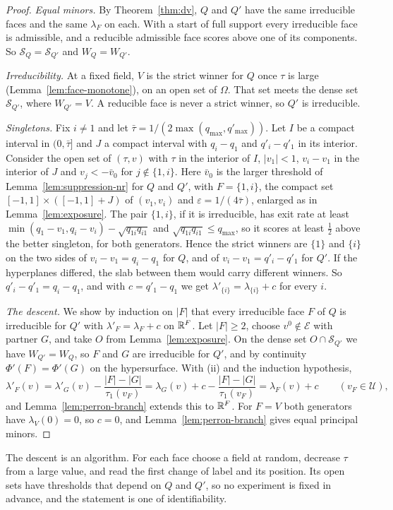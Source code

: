 \begin{proof}
\emph{Equal minors.} By Theorem~\ref{thm:dv}, $Q$ and $Q'$ have the same irreducible faces and
the same $\lambda_F$ on each. With a start of full support every irreducible face is admissible,
and a reducible admissible face scores above one of its components. So $\mathcal S_Q=\mathcal
S_{Q'}$ and $W_Q=W_{Q'}$.

\emph{Irreducibility.} At a fixed field, $V$ is the strict winner for $Q$ once $\tau$ is large
(Lemma~\ref{lem:face-monotone}), on an open set of $\Omega$. That set meets the dense set
$\mathcal S_{Q'}$, where $W_{Q'}=V$. A reducible face is never a strict winner, so $Q'$ is
irreducible.

\emph{Singletons.} Fix $i\ne1$ and let $\bar\tau=1/(2\max(q_{\max},q'_{\max}))$. Let $I$ be a
compact interval in $(0,\bar\tau]$ and $J$ a compact interval with $q_i-q_1$ and $q'_i-q'_1$ in its
interior. Consider the open set of $(\tau,v)$ with $\tau$ in the interior of $I$, $|v_1|<1$,
$v_i-v_1$ in the interior of $J$ and $v_j<-\bar v_0$ for $j\notin\{1,i\}$. Here $\bar v_0$ is the
larger threshold of Lemma~\ref{lem:suppression-nr} for $Q$ and $Q'$, with $F=\{1,i\}$, the compact
set $[-1,1]\times([-1,1]+J)$ of $(v_1,v_i)$ and $\varepsilon=1/(4\bar\tau)$, enlarged as in
Lemma~\ref{lem:exposure}. The pair $\{1,i\}$, if it is
irreducible, has exit rate at least $\min(q_1-v_1,q_i-v_i)-\sqrt{q_{1i}q_{i1}}$ and
$\sqrt{q_{1i}q_{i1}}\le q_{\max}$, so it scores at least $\frac12$ above the better singleton, for
both generators. Hence the strict winners are $\{1\}$ and $\{i\}$ on the two sides of
$v_i-v_1=q_i-q_1$ for $Q$, and of $v_i-v_1=q'_i-q'_1$ for $Q'$. If the hyperplanes differed, the
slab between them would carry different winners. So $q'_i-q'_1=q_i-q_1$, and with $c=q'_1-q_1$ we
get $\lambda'_{\{i\}}=\lambda_{\{i\}}+c$ for every $i$.

\emph{The descent.} We show by induction on $|F|$ that every irreducible face $F$ of $Q$ is
irreducible for $Q'$ with $\lambda'_F=\lambda_F+c$ on $\mathbb{R}^F$. Let $|F|\ge2$, choose
$v^0\notin\mathcal E$ with partner $G$, and take $O$ from Lemma~\ref{lem:exposure}. On the dense
set $O\cap\mathcal S_{Q'}$ we have $W_{Q'}=W_Q$, so $F$ and $G$ are irreducible for $Q'$, and by
continuity $\Phi'(F)=\Phi'(G)$ on the hypersurface. With (ii) and the induction hypothesis,
\[
 \lambda'_F(v)=\lambda'_G(v)-\frac{|F|-|G|}{\tau_1(v_F)}=\lambda_G(v)+c-\frac{|F|-|G|}{\tau_1(v_F)}
 =\lambda_F(v)+c\qquad(v_F\in\mathcal U),
\]
and Lemma~\ref{lem:perron-branch} extends this to $\mathbb{R}^F$. For $F=V$ both generators have
$\lambda_V(0)=0$, so $c=0$, and Lemma~\ref{lem:perron-branch} gives equal principal minors.
\end{proof}

The descent is an algorithm. For each face choose a field at random, decrease $\tau$ from a large
value, and read the first change of label and its position. Its open sets have thresholds that
depend on $Q$ and $Q'$, so no experiment is fixed in advance, and the statement is one of
identifiability.
